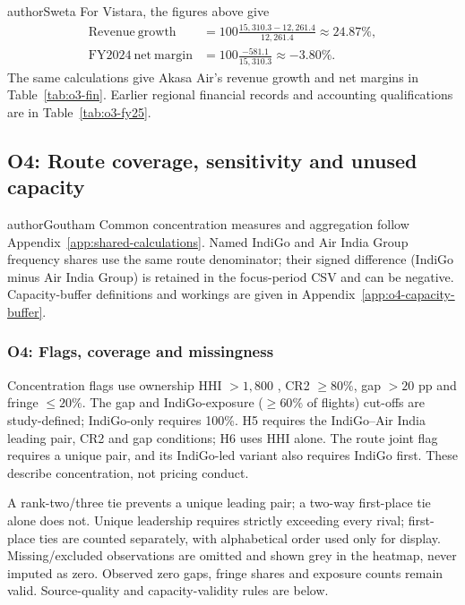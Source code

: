 \begin{mergedcontribution}{authorSweta}
For Vistara, the figures above give
\begin{align*}
\mathrm{Revenue\ growth}
&=100\frac{15{,}310.3-12{,}261.4}{12{,}261.4}\approx24.87\%,\\
\mathrm{FY2024\ net\ margin}
&=100\frac{-581.1}{15{,}310.3}\approx-3.80\%.
\end{align*}
The same calculations give Akasa Air's revenue growth and net margins in Table~\ref{tab:o3-fin}.
Earlier regional financial records and accounting qualifications are in Table~\ref{tab:o3-fy25}.
\end{mergedcontribution}
\subsection{O4: Route coverage, sensitivity and unused capacity}
\label{app:o4-route-preparation}
\begin{mergedcontribution}{authorGoutham}
Common concentration measures and aggregation follow Appendix~\ref{app:shared-calculations}. Named IndiGo and Air India Group frequency shares use the same route denominator; their signed difference (IndiGo minus Air India Group) is retained in the focus-period CSV and can be negative. Capacity-buffer definitions and workings are given in Appendix~\ref{app:o4-capacity-buffer}.

\subsubsection{O4: Flags, coverage and missingness}
\label{app:o4-flags}
Concentration flags use ownership HHI $>1{,}800$ \parencite[Section~2.1]{dojftc2023merger}, CR2 $\geq80\%$, gap $>20$ pp and fringe $\leq20\%$. The gap and IndiGo-exposure ($\geq60\%$ of flights) cut-offs are study-defined; IndiGo-only requires 100\%. H5 requires the IndiGo--Air India leading pair, CR2 and gap conditions; H6 uses HHI alone. The route joint flag requires a unique pair, and its IndiGo-led variant also requires IndiGo first. These describe concentration, not pricing conduct.

A rank-two/three tie prevents a unique leading pair; a two-way first-place tie alone does not. Unique leadership requires strictly exceeding every rival; first-place ties are counted separately, with alphabetical order used only for display. Missing/excluded observations are omitted and shown grey in the heatmap, never imputed as zero. Observed zero gaps, fringe shares and exposure counts remain valid. Source-quality and capacity-validity rules are below.


\end{mergedcontribution}

